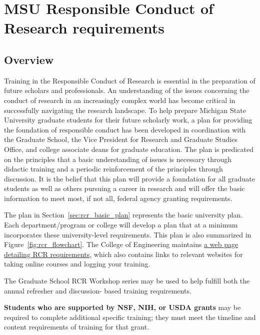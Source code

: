 \section{MSU Responsible Conduct of Research requirements}
\label{sec:rcr_requirements}

\subsection{Overview}

Training in the Responsible Conduct of Research is essential in the
preparation of future scholars and professionals. An understanding of
the issues concerning the conduct of research in an increasingly
complex world has become critical in successfully navigating the
research landscape. To help prepare Michigan State University graduate
students for their future scholarly work, a plan for providing the
foundation of responsible conduct has been developed in coordination
with the Graduate School, the Vice President for Research and Graduate
Studies Office, and college associate deans for graduate
education. The plan is predicated on the principles that a basic
understanding of issues is necessary through didactic training and a
periodic reinforcement of the principles through discussion. It is the
belief that this plan will provide a foundation for all graduate
students as well as others pursuing a career in research and will
offer the basic information to meet most, if not all, federal agency
granting requirements.

The plan in Section~\ref{sec:rcr_basic_plan} represents the basic university plan. Each
department/program or college will develop a plan that at a minimum
incorporates these university-level requirements.  This plan is also
summarized in Figure~\ref{fig:rcr_flowchart}.  The College of
Engineering maintains
\href{https://www.egr.msu.edu/academics/graduate/rcr}{a web page
  detailing RCR requirements}, which also contains links to relevant
websites for taking online courses and logging your training.

The Graduate School RCR Workshop series may be used to help fulfill
both the annual refresher and discussion- based training requirements.

\vspace{2mm}
\noindent
\textbf{Students who are supported by NSF, NIH, or USDA grants} may be required to complete additional specific training; they must meet the timeline and content requirements of training for that grant.

